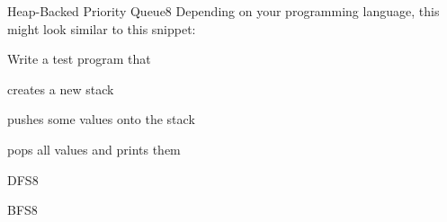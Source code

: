 \documentclass[a4paper]{article}
\begin{document}
\header

\begin{problem}{Heap-Backed Priority Queue}{8}
Depending on your programming language, this might look similar to this snippet:
\begin{acode}
\end{acode}

Write a test program that
\begin{compactitem}
 \item creates a new stack
 \item pushes some values onto the stack
 \item pops all values and prints them
\end{compactitem}
\end{problem}

\begin{problem}{DFS}{8}
\end{problem}

\begin{problem}{BFS}{8}

\end{problem}
\end{document}
